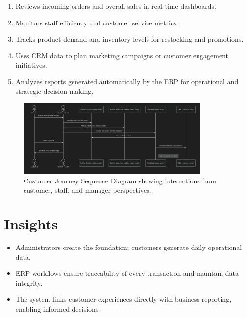 \begin{enumerate}
    \item Reviews incoming orders and overall sales in real-time dashboards.  
    \item Monitors staff efficiency and customer service metrics.  
    \item Tracks product demand and inventory levels for restocking and promotions.  
    \item Uses CRM data to plan marketing campaigns or customer engagement initiatives.  
    \item Analyzes reports generated automatically by the ERP for operational and strategic decision-making.  
\end{enumerate}

\begin{figure}[H]
    \centering
    \includegraphics[width=0.85\textwidth]{diagrams/customer_journey.png}
    \caption{Customer Journey Sequence Diagram showing interactions from customer, staff, and manager perspectives.}
    \label{fig:customer_journey}
\end{figure}

\section*{Insights}
\begin{itemize}
    \item Administrators create the foundation; customers generate daily operational data.  
    \item ERP workflows ensure traceability of every transaction and maintain data integrity.  
    \item The system links customer experiences directly with business reporting, enabling informed decisions.  
\end{itemize}

